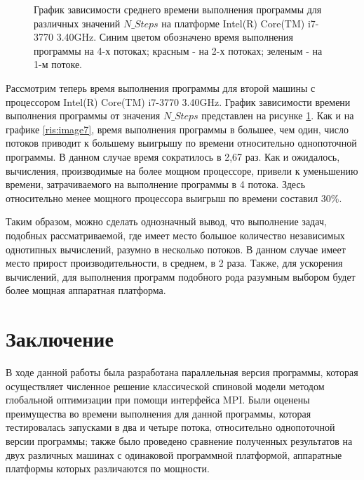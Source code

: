 \documentclass[14pt,a4paper,report]{ncc}
\begin{document}
\begin{figure}[h!]
\caption{График зависимости среднего времени выполнения программы для различных значений $N\_Steps$ на платформе Intel(R) Core(TM) i7-3770 3.40GHz.
Синим цветом обозначено время выполнения программы на 4-х потоках; красным - на 2-х потоках; зеленым - на 1-м потоке.}
\label{ris:image8}
\end{figure}
Рассмотрим теперь время выполнения программы для второй машины с процессором Intel(R) Core(TM) i7-3770 3.40GHz. График зависимости времени выполнения программы от значения $N\_Steps$ представлен на рисунке \ref{ris:image8}. Как и на графике \ref{ris:image7}, время выполнения программы в большее, чем один, число потоков приводит к большему выигрышу по времени относительно однопоточной программы. В данном случае время сократилось в 2,67 раз. Как и ожидалось, вычисления, производимые на более мощном процессоре, привели к уменьшению времени, затрачиваемого на выполнение программы в 4 потока. Здесь относительно менее мощного процессора выигрыш по времени составил 30\%. 
\

Таким образом, можно сделать однозначный вывод, что выполнение задач, подобных рассматриваемой, где имеет место большое количество независимых однотипных вычислений, разумно в несколько потоков. В данном случае имеет место прирост производительности, в среднем, в 2 раза. Также, для ускорения вычислений, для выполнения программ подобного рода разумным выбором будет более мощная аппаратная платформа. 
\chapter*{Заключение}
В ходе данной работы была разработана параллельная версия программы, которая осуществляет численное решение классической спиновой модели методом глобальной оптимизации при помощи интерфейса MPI. Были оценены преимущества во времени выполнения для данной программы, которая тестировалась запусками в два и четыре потока, относительно однопоточной версии программы; также было проведено сравнение полученных результатов на двух различных машинах с одинаковой программной платформой, аппаратные платформы которых различаются по мощности.
\
\end{document}

